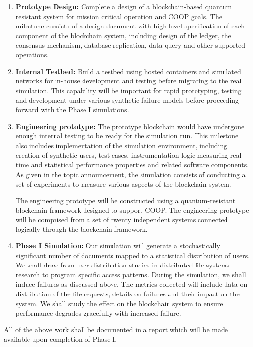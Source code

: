 \begin{enumerate}
\item {\bf Prototype Design:} Complete a design of a blockchain-based quantum resistant system for
mission critical operation and COOP goals. The milestone consists of a design document with high-level specification of
each component of the blockchain system, including design of the ledger, the consensus mechanism, database replication,
data query and other supported operations.


\item {\bf Internal Testbed:} Build a testbed using hosted containers and simulated networks for in-house 
development and testing before migrating to the real simulation. This capability will be important for rapid prototyping, testing
and development under various synthetic failure models before proceeding forward with the Phase I simulations.

\item {\bf Engineering prototype:} The prototype blockchain would have undergone enough internal testing to be ready for
the simulation run. This milestone also includes implementation of the simulation environment, including creation of
synthetic users, test cases, instrumentation logic measuring real-time and statistical performance properties and
related software components. As given in the topic announcement, the simulation consists of conducting a set of
experiments to measure various aspects of the blockchain system. 

The engineering prototype will be constructed using a quantum-resistant blockchain framework designed to
support COOP. The engineering prototype will be comprised from a set of twenty independent systems connected logically
through the blockchain framework. 

\item {\bf Phase I Simulation:}  Our simulation will generate a stochastically significant number of documents mapped to
a statistical distribution of users. We shall draw from user distribution studies in distributed file systems research
to program specific access patterns. During the simulation, we shall induce failures as discussed above. The metrics
collected will include data on distribution of the file requests, details on failures and their impact on the system. We
shall study the effect on the blockchain system to ensure performance degrades gracefully with increased failure.

\end{enumerate}

All of the above work shall be documented in a report which will be made available upon completion of Phase I.
